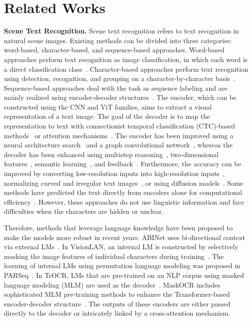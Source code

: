 \documentclass[10pt,twocolumn,letterpaper]{article}
\begin{document}
\section{Related Works}
\noindent
\textbf{Scene Text Recognition.}
Scene text recognition refers to text recognition in natural scene images.
Existing methods can be divided into three categories: word-based, character-based, and sequence-based approaches.
Word-based approaches perform text recognition as image classification, in which each word is a direct classification class~\cite{jaderberg2016MJSynth}.
Character-based approaches perform text recognition using detection, recognition, and grouping on a character-by-character basis~\cite{wan2020textscanner}.
Sequence-based approaches deal with the task as sequence labeling and are mainly realized using encoder-decoder structures~\cite{shi2016crnn, fang2021ABINet, li2021trocr}.
The encoder, which can be constructed using the CNN and ViT families, aims to extract a visual representation of a text image.
The goal of the decoder is to map the representation to text with connectionist temporal classification (CTC)-based methods~\cite{graves2006ctcloss, shi2016crnn} or attention mechanisms~\cite{bautista2022parseq, li2021trocr, yu2020srn, lu2021master}.
The encoder has been improved using a neural architecture search~\cite{zhang2020autostr} and a graph convolutional network~\cite{yan2021pren2d}, whereas the decoder has been enhanced using multistep reasoning~\cite{bhunia2021joint}, two-dimensional features~\cite{li2019show}, semantic learning~\cite{qiao2020seed}, and feedback~\cite{bhunia2021towards}.
Furthermore, the accuracy can be improved by converting low-resolution inputs into high-resolution inputs~\cite{mou2020plugnet}, normalizing curved and irregular text images~\cite{shi2018aster, luo2019moran, baek2021TRBA}, or using diffusion models~\cite{fujitake2023diffusionstr}.
Some methods have predicted the text directly from encoders alone for computational efficiency~\cite{du2022svtr, atienza2021vitstr}.
However, these approaches do not use linguistic information and face difficulties when the characters are hidden or unclear. 



Therefore, methods that leverage language knowledge have been proposed to make the models more robust in recent years.
ABINet uses bi-directional context via external LMs~\cite{fang2021ABINet}.
In VisionLAN, an internal LM is constructed by selectively masking the image features of individual characters during training~\cite{wang2021visionlan}.
The learning of internal LMs using permutation language modeling was proposed in PARSeq~\cite{bautista2022parseq}.
In TrOCR, LMs that are pre-trained on an NLP corpus using masked language modeling (MLM) are used as the decoder~\cite{li2021trocr}.
MaskOCR includes sophisticated MLM pre-training methods to enhance the Transformer-based encoder-decoder structure~\cite{lyu2022maskocr}.
The outputs of these encoders are either passed directly to the decoder or intricately linked by a cross-attention mechanism.
\end{document}
